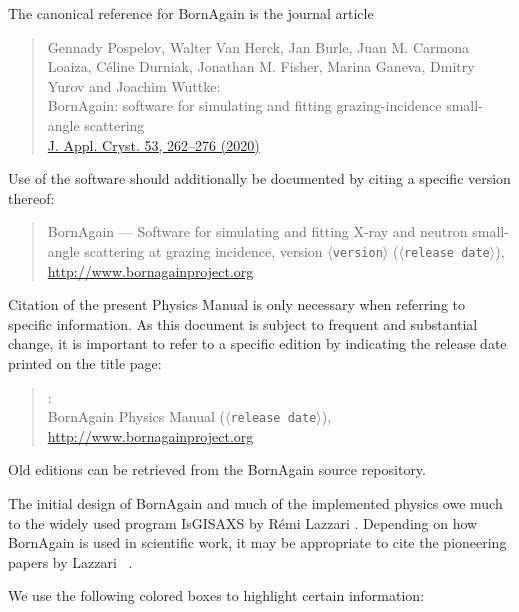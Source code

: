 %
The canonical reference for BornAgain is the journal article \cite{PoVB20}
\begin{quote}
Gennady Pospelov, Walter Van Herck, Jan Burle, Juan M. Carmona Loaiza,
Céline Durniak, Jonathan M. Fisher, Marina Ganeva, Dmitry Yurov and
Joachim Wuttke:\\
BornAgain: software for simulating and fitting
grazing-incidence small-angle scattering\\
\href{https://doi.org/10.1107/S1600576719016789}{J. Appl. Cryst. 53, 262–276 (2020)}
\end{quote}
Use of the software should additionally be documented by citing a specific version thereof:
\begin{quote}
BornAgain --- Software for simulating and fitting
X-ray and neutron small-angle scattering at grazing incidence,
version $\langle$\texttt{version}$\rangle$ ($\langle$\texttt{release date}$\rangle$),\\
\url{http://www.bornagainproject.org}
\end{quote}
Citation of the present Physics Manual is only necessary
when referring to specific information.
As this document is subject to frequent and substantial change,
it is important to refer to a specific edition by indicating the release date
printed on the title page:
\begin{quote}
\authors:\\
BornAgain Physics Manual ($\langle$\texttt{release date}$\rangle$),\\
\url{http://www.bornagainproject.org}
\end{quote}
Old editions can be retrieved from the BornAgain source repository.

The initial design of BornAgain and much of the implemented physics owe much
to the widely used program IsGISAXS
%
%
by R\'emi Lazzari \cite{Laz06}.
Depending on how BornAgain is used in scientific work,
it may be appropriate to cite the pioneering papers
by Lazzari \etal\ \cite{Laz02,ReLL09}.



We use the following colored boxes to highlight
certain information:

\def\demobox#1{\noindent\strut\hspace{.2\TW}\begin{minipage}{.75\textwidth}#1
\end{minipage}\hfill\strut}


